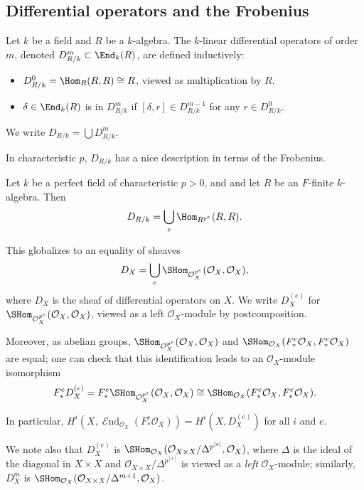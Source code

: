 \documentclass{article}
\def\O{\mathcal O}
\numberwithin{equation}{section}
\theoremstyle{theorem}
\numberwithin{thm}{section}
\theoremstyle{definition}
\DeclareMathOperator{\SEnd}{\mathcal{E}nd}
\begin{document}
\subsection{Differential operators and the Frobenius}

\begin{dfn}
Let $k$ be a field and
$R$ be a $k$-algebra. The $k$-linear differential operators of order $m$, denoted $D^m_{R/k}\subset \End_k(R)$, are defined inductively:
\begin{itemize}
\item $D^0_{R/k} =\Hom_R(R,R)\cong R$, viewed as multiplication by $R$. 
\item  $\delta \in \End_k(R)$ is in $D^m_{R/k}$ if $[\delta, r] \in D^{m-1}_{R/k}$ for any $r\in D^0_{R/k}$.
\end{itemize}
We write $D_{R/k}=\bigcup D^m_{R/k}$. 
\end{dfn}

In characteristic $p$, $D_{R/k}$ has a nice description in terms of the Frobenius.

\begin{prop}
Let $k$ be a perfect field of characteristic $p>0$, and 
and  let $R$ be an $F$-finite $k$-algebra. Then 
$$
D_{R/k} = \bigcup_{e} \Hom_{R^{p^e}}(R,R).
$$
\end{prop}

\begin{rem}
This globalizes to an equality of sheaves
$$
D_{X} = \bigcup_{e} \SHom_{\O_X^{p^e}}(\O_X,\O_X),
$$
where $D_X$ is the sheaf of differential operators on $X$.
We write $D^{(e)}_X$ for $\SHom_{\O_X^{p^e}}(\O_X,\O_X)$, viewed as a left $\O_X$-module by postcomposition.

Moreover, as abelian groups,
$ \SHom_{\O_X^{p^e}}(\O_X,\O_X)$ and $ \SHom_{\O_X}(F_*^e\O_X,F_*^e\O_X) $ are equal; one can check that 
this identification leads to an $\O_X$-module isomorphism
$$
 F_*^eD^{(e)}_X= F_*^e\SHom_{\O_X^{p^e}}(\O_X,\O_X) \cong 
\SHom_{\O_X}(F_*^e\O_X,F_*^e\O_X) .
$$

In particular, $H^i(X,\SEnd_{\O_X}(F_*^e\O_X))=H^i(X,D^{(e)}_X)$ for all $i$ and $e$.
\end{rem}

\begin{rem}
\label{pparts}
We note also that $D_X^{( e )}$ is $\SHom_{\O_X}(\O_{X\times X}/\Delta^{p^{[e]}},\O_X)$, where $\Delta$ is the ideal of the diagonal in $X\times X$ and $\O_{X\times X}/\Delta^{p^{[e]}}$ is viewed as a \emph{left} $\O_X$-module; similarly, 
$D_X^m $ is $\SHom_{\O_X}(\O_{X\times X}/\Delta^{m+1},\O_X)$.
\end{rem}
\end{document}
